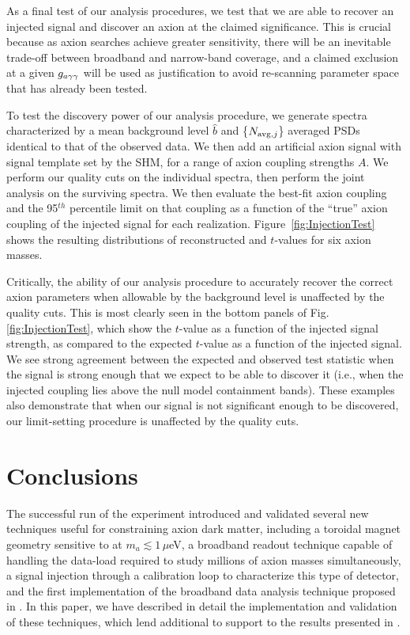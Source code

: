 \documentclass[aps,prd,amsmath,amssymb,reprint,superscriptaddress, nofootinbib,
]{revtex4-1}
\begin{document}
As a final test of our analysis procedures, we test that we are able to recover an injected signal and discover an axion at the claimed significance. This is crucial because as axion searches achieve greater sensitivity, there will be an inevitable trade-off between broadband and narrow-band coverage, and a claimed exclusion at a given $g_{a\gamma\gamma}$ will be used as justification to avoid re-scanning parameter space that has already been tested.

To test the discovery power of our analysis procedure, we generate \MC spectra characterized by a mean background level $\hat b$ and \{$N_{{\rm avg}, j}$\} averaged PSDs identical to that of the observed data. We then add an artificial axion signal with signal template set by the SHM, for a range of axion coupling strengths $A$. We perform our quality cuts on the individual spectra, then perform the joint analysis on the surviving spectra. We then evaluate the best-fit axion coupling and the 95$^{th}$ percentile limit on that coupling as a function of the ``true'' axion coupling of the injected signal for each \MC realization. Figure~\ref{fig:InjectionTest} shows the resulting distributions of reconstructed \gagg and $t$-values for six axion masses. 

Critically, the ability of our analysis procedure to accurately recover the correct axion parameters when allowable by the background level is unaffected by the quality cuts. This is most clearly seen in the bottom panels of Fig. \ref{fig:InjectionTest}, which show the $t$-value as a function of the injected signal strength, as compared to the expected $t$-value as a function of the injected signal. We see strong agreement between the expected and observed test statistic when the signal is strong enough that we expect to be able to discover it (i.e., when the injected coupling lies above the null model containment bands). These examples also demonstrate that when our signal is not significant enough to be discovered, our limit-setting procedure is unaffected by the quality cuts.

 
\section{Conclusions}
The successful run of the \abra experiment \cite{ABRAFirstResults} introduced and validated several new techniques useful for constraining axion dark matter, including a toroidal magnet geometry sensitive to \ADM at $m_a\lesssim1\,\mu$eV, a broadband readout technique capable of handling the data-load required to study millions of axion masses simultaneously, a signal injection through a calibration loop to characterize this type of detector, and the first implementation of the broadband data analysis technique proposed in \cite{Foster2018}. In this paper, we have described in detail the implementation and validation of these techniques, which lend additional to support to the results presented in \cite{ABRAFirstResults}. 
\end{document}
